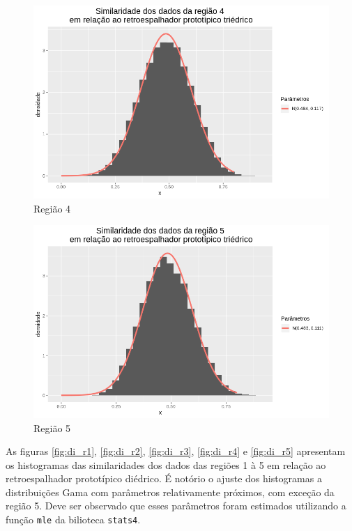 \documentclass[12pt]{article}
\begin{document}
\begin{figure}[!h]
    \centering    
    \vspace{0.1\linewidth}
    \includegraphics[width = 0.95\linewidth]{../../Images/Report_18_12_17/tri_region4.png}
    \caption{Região 4}
    \label{fig:tri_r4}
\end{figure}

\begin{figure}[!h]
    \centering    
    \vspace{0.1\linewidth}
    \includegraphics[width = 0.95\linewidth]{../../Images/Report_18_12_17/tri_region5.png}
    \caption{Região 5}
    \label{fig:tri_r5}
\end{figure}

As figuras \ref{fig:di_r1}, \ref{fig:di_r2}, \ref{fig:di_r3}, \ref{fig:di_r4} e \ref{fig:di_r5} apresentam os histogramas das similaridades dos dados das regiões 1 à 5 em relação ao retroespalhador prototípico diédrico. É notório o ajuste dos histogramas a distribuições Gama com parâmetros relativamente próximos, com exceção da região 5. Deve ser observado que esses parâmetros foram estimados utilizando a função \texttt{mle} da bilioteca \texttt{stats4}.
\end{document}
